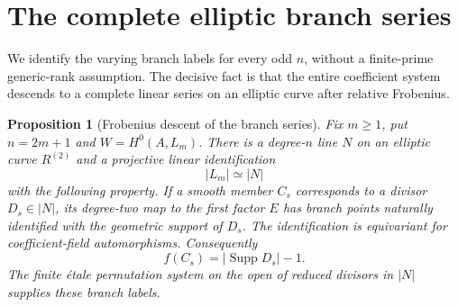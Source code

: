 \documentclass[11pt]{article}
\newtheorem{proposition}[theorem]{Proposition}
\theoremstyle{remark}\newtheorem{remark}[theorem]{Remark}
\begin{document}
\section{The complete elliptic branch series}\label{sec:series}

We identify the varying branch labels for every odd $n$, without a finite-prime generic-rank assumption. The decisive fact is that the entire coefficient system descends to a complete linear series on an elliptic curve after relative Frobenius.

\begin{proposition}[Frobenius descent of the branch series]\label{prop:series}
Fix $m\ge1$, put $n=2m+1$ and $W=H^0(A,L_m)$. There is a degree-$n$ line $N$ on an elliptic curve $R^{(2)}$ and a projective linear identification
\begin{equation}\label{eq:series-isom}
                             |L_m|\simeq|N|
\end{equation}
with the following property. If a smooth member $C_s$ corresponds to a divisor $D_s\in|N|$, its degree-two map to the first factor $E$ has branch points naturally identified with the geometric support of $D_s$. The identification is equivariant for coefficient-field automorphisms. Consequently
\begin{equation}\label{eq:every-rank}
                       f(C_s)=|\operatorname{Supp}D_s|-1.
\end{equation}
The finite \'etale permutation system on the open of reduced divisors in $|N|$ supplies these branch labels.
\end{proposition}
\end{document}
